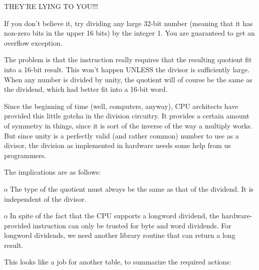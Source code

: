 \documentclass[float=false, crop=false]{standalone}
\begin{document}
                     THEY'RE LYING TO YOU!!!


If you don't believe it, try dividing any large 32-bit number (meaning that it
has non-zero bits in the upper 16 bits) by the integer 1. You are guaranteed to
get an overflow exception.

The problem is that the instruction really requires that the resulting quotient
fit into a 16-bit result. This won't happen UNLESS the divisor is sufficiently
large. When any number is divided by unity, the quotient will of course be the
same as the dividend, which had better fit into a 16-bit word.

Since the beginning of time (well, computers, anyway), CPU architects have
provided this little gotcha in the division circuitry. It provides a certain
amount of symmetry in things, since it is sort of the inverse of the way a
multiply works. But since unity is a perfectly valid (and rather common) number
to use as a divisor, the division as implemented in hardware needs some help
from us programmers.

The implications are as follows:

  o  The type of the quotient must always be the same as  that of
     the dividend.  It is independent of the divisor.

  o  In spite of  the  fact  that  the  CPU  supports  a longword
     dividend,  the hardware-provided  instruction  can  only  be
     trusted  for  byte  and  word  dividends.      For  longword
     dividends, we need another library routine that can return a
     long result.



This  looks  like  a job for  another  table,  to  summarize  the
required actions:
\end{document}
